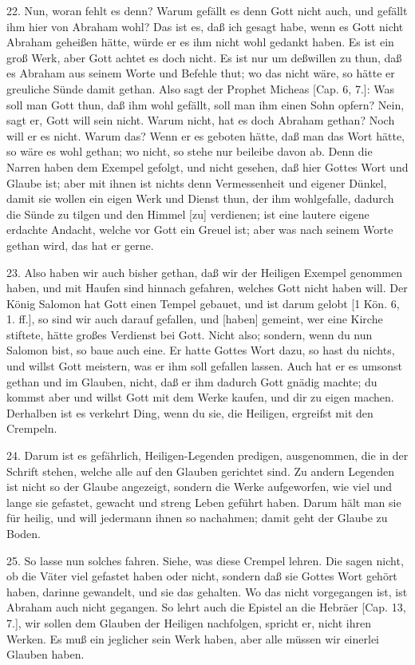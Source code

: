 22. Nun, woran fehlt es denn? Warum gefällt es denn Gott nicht auch, und gefällt ihm hier von Abraham wohl? Das ist es, daß ich gesagt habe, wenn es Gott nicht Abraham geheißen hätte, würde er es ihm nicht wohl gedankt haben. Es ist ein groß Werk, aber Gott achtet es doch nicht. Es ist nur um deßwillen zu thun, daß es Abraham aus seinem Worte und Befehle thut; wo das nicht wäre, so hätte er greuliche Sünde damit gethan. Also sagt der Prophet Micheas [Cap. 6, 7.]: Was soll man Gott thun, daß ihm wohl gefällt, soll man ihm einen Sohn opfern? Nein, sagt er, Gott will sein nicht. Warum nicht, hat es doch Abraham gethan? Noch will er es nicht. Warum das? Wenn er es geboten hätte, daß man das Wort hätte, so wäre es wohl gethan; wo nicht, so stehe nur beileibe davon ab. Denn die Narren haben dem Exempel gefolgt, und nicht gesehen, daß hier Gottes Wort und Glaube ist; aber mit ihnen ist nichts denn Vermessenheit und eigener Dünkel, damit sie wollen ein eigen Werk und Dienst thun, der ihm wohlgefalle, dadurch die Sünde zu tilgen und den Himmel [zu] verdienen; ist eine lautere eigene erdachte Andacht, welche vor Gott ein Greuel ist; aber was nach seinem Worte gethan wird, das hat er gerne.

23. Also haben wir auch bisher gethan, daß wir der Heiligen Exempel genommen haben, und mit Haufen sind hinnach gefahren, welches Gott nicht haben will. Der König Salomon hat Gott einen Tempel gebauet, und ist darum gelobt [1 Kön. 6, 1. ff.], so sind wir auch darauf gefallen, und [haben] gemeint, wer eine Kirche stiftete, hätte großes Verdienst bei Gott. Nicht also; sondern, wenn du nun Salomon bist, so
baue auch eine. Er hatte Gottes Wort dazu, so hast du nichts, und willst Gott meistern, was er ihm soll gefallen lassen. Auch hat er es umsonst gethan und im Glauben, nicht, daß er ihm dadurch Gott gnädig machte; du kommst aber und willst Gott mit dem Werke kaufen, und dir zu eigen machen. Derhalben ist es verkehrt Ding, wenn du sie, die Heiligen, ergreifst mit den Crempeln.

24. Darum ist es gefährlich, Heiligen-Legenden predigen, ausgenommen, die in der Schrift stehen, welche alle auf den Glauben gerichtet sind. Zu andern Legenden ist nicht so der Glaube angezeigt, sondern die Werke aufgeworfen, wie viel und lange sie gefastet, gewacht und streng Leben geführt haben. Darum hält man sie für heilig, und will jedermann ihnen so nachahmen; damit geht der Glaube zu Boden.

25. So lasse nun solches fahren. Siehe, was diese Crempel lehren. Die sagen nicht, ob die Väter viel gefastet haben oder nicht, sondern daß sie Gottes Wort gehört haben, darinne gewandelt, und sie das gehalten. Wo das nicht vorgegangen ist, ist Abraham auch nicht gegangen. So lehrt auch die Epistel an die Hebräer [Cap. 13, 7.], wir sollen dem Glauben der Heiligen nachfolgen, spricht er, nicht ihren Werken. Es muß ein jeglicher sein Werk haben, aber alle müssen wir einerlei Glauben haben.

